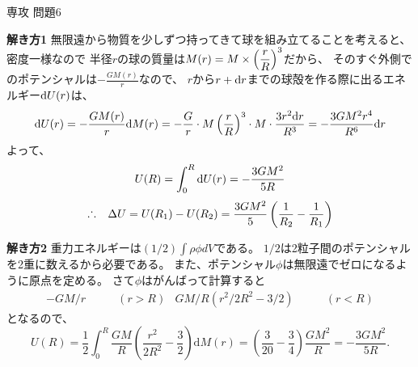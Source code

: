 \documentclass[fleqn]{jbook}
\begin{document}
\begin{answer}{専攻 問題6}{}

\begin{subanswers}
\SubAnswer


\noindent\textbf{解き方1}\quad
無限遠から物質を少しずつ持ってきて球を組み立てることを考えると、
密度一様なので
半径$r$の球の質量は$M(r)=M\times\displaystyle{\left(\frac{r}{R}\right)^3}$だから、
そのすぐ外側でのポテンシャルは$-\frac{GM(r)}{r}$なので、
$r$から$r+{\rm d}r$までの球殻を作る際に出るエネルギー${\rm d}U(r)$は、
\[ {\rm d}U(r)=-\frac{GM(r)}{r}{\rm d}M(r)=-\frac{G}{r}\cdot M\left(\frac{r}{R}\right)^3 \cdot M\cdot \frac{3r^2{\rm d}r}{R^3}=-\frac{3GM^2 r^4}{R^6}{\rm d}r \]
よって、
\[ U(R)=\int_0^R{\rm d}U(r)=-\frac{3GM^2}{5R} \]
\[\Yueni \Delta U=U(R_1)-U(R_2)=\frac{3GM^2}{5}\left(\frac{1}{R_2}-\frac{1}{R_1}\right) \]

\noindent\textbf{解き方2}\quad
重力エネルギーは$(1/2)\int \rho\phi dV$である。
$1/2$は2粒子間のポテンシャルを2重に数えるから必要である。
また、ポテンシャル$\phi$は無限遠でゼロになるように原点を定める。
さて$\phi$はがんばって計算すると\begin{align*}
-GM/r&\qquad(r>R)&GM/R(r^2/2R^2-3/2)&\qquad(r<R)
\end{align*}となるので、\[
U(R)=\frac12\int_0^R \frac{GM}{R}\left(\frac{r^2}{2R^2}-\frac 32\right)\mathrm{d}M(r)=\left(\frac3{20}-\frac 34\right)\frac{GM^2}{R}=-\frac{3GM^2}{5R}.
\]


\end{subanswers}
\end{answer}
\end{document}
